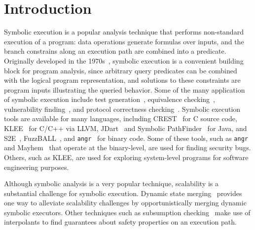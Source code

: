 \section{Introduction}
%
Symbolic execution is a popular analysis technique that performs non-standard execution of a program: data operations generate formulas over inputs, and the branch constrains along an execution path are combined into a predicate.
%
Originally developed in the 1970s~\cite{King1976,Clarke1976}, symbolic execution is a convenient building block for program analysis, since arbitrary query predicates can be combined with the logical program representation, and solutions to these constraints are program inputs illustrating the queried behavior.
%
Some of the many application of symbolic execution include
test generation~\cite{dart,cute}, equivalence checking~\cite{ramos,adaptorsynth}, vulnerability finding~\cite{driller,angr}, and protocol correctness checking~\cite{transport}.
%
Symbolic execution tools are available for many languages, including
CREST~\cite{BurnimS2008} for C source code, KLEE~\cite{CadarDE2008}
for C/C++ via LLVM, JDart~\cite{jdart2016} and Symbolic
PathFinder~\cite{spf} for Java, and S2E~\cite{ChipounovKC2012},
FuzzBALL~\cite{BabicMMS2011}, and {\tt angr}~\cite{angr} for binary code.
%
Some of these tools, such as {\tt angr} and Mayhem~\cite{mayhem} that operate at the binary-level, are used for finding
security bugs.
%
Others, such as KLEE, are used for exploring system-level programs for software engineering purposes.


Although symbolic analysis is a very popular technique, scalability is a substantial challenge for symbolic execution.
%
Dynamic state merging~\cite{kuznetsov} provides one way to
alleviate scalability challenges by opportunistically merging dynamic
symbolic executors. %
%
Other techniques such as subsumption checking~\cite{Tian:2017:MEI:3155562.3155589} make use of interpolants to find
guarantees about safety properties on an execution path.
 
